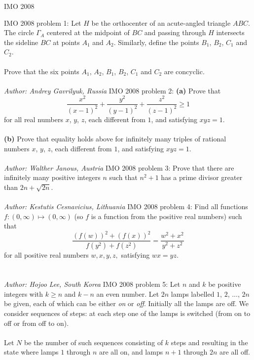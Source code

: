 IMO 2008 

IMO 2008 problem 1:  Let $ H$ be the orthocenter of an acute-angled triangle $ ABC$. The circle $ \Gamma_A$ centered at the midpoint of $ BC$ and passing through $ H$ intersects the sideline $ BC$ at points  $ A_1$ and $ A_2$. Similarly, define the points $ B_1$, $ B_2$, $ C_1$ and $ C_2$. \\\\
Prove that the six points $ A_1$, $ A_2$, $ B_1$, $ B_2$, $ C_1$ and $ C_2$ are concyclic. \\\\
\textit{Author: Andrey Gavrilyuk, Russia} 
IMO 2008 problem 2:  \textbf{(a)} Prove that
\[
\frac {x^2}{\left(x - 1\right)^2} + \frac {y^2}{\left(y - 1\right)^2} + \frac {z^2}{\left(z - 1\right)^2} \geq 1
\]
for all real numbers $x$, $y$, $z$, each different from $1$, and satisfying $xyz=1$. \\\\
\textbf{(b)} Prove that equality holds above for infinitely many triples of rational numbers $x$, $y$, $z$, each different from $1$, and satisfying $xyz=1$. \\\\
\textit{Author: Walther Janous, Austria} 
IMO 2008 problem 3:  Prove that there are infinitely many positive integers $ n$ such that $ n^2 + 1$ has a prime divisor greater than $ 2n + \sqrt {2n}$. \\\\
\textit{Author: Kestutis Cesnavicius, Lithuania} 
IMO 2008 problem 4:  Find all functions $ f: (0, \infty) \mapsto (0, \infty)$ (so $ f$ is a function from the positive real numbers) such that
\[
\frac {\left( f(w) \right)^2 + \left( f(x) \right)^2}{f(y^2) + f(z^2) } = \frac {w^2 + x^2}{y^2 + z^2}
\]
for all positive real numbers $ w,x,y,z,$ satisfying $ wx = yz.$ \\\\\\
\textit{Author: Hojoo Lee, South Korea} 
IMO 2008 problem 5:  Let $ n$ and $ k$ be positive integers with $ k \geq n$ and $ k - n$ an even number. Let $ 2n$ lamps labelled $ 1$, $ 2$, ..., $ 2n$ be given, each of which can be either \textit{on} or \textit{off}. Initially all the lamps are off. We consider sequences of steps: at each step one of the lamps is switched (from on to off or from off to on). \\\\
Let $ N$ be the number of such sequences consisting of $ k$ steps and resulting in the state where lamps $ 1$ through $ n$ are all on, and lamps $ n + 1$ through $ 2n$ are all off. \\\\
